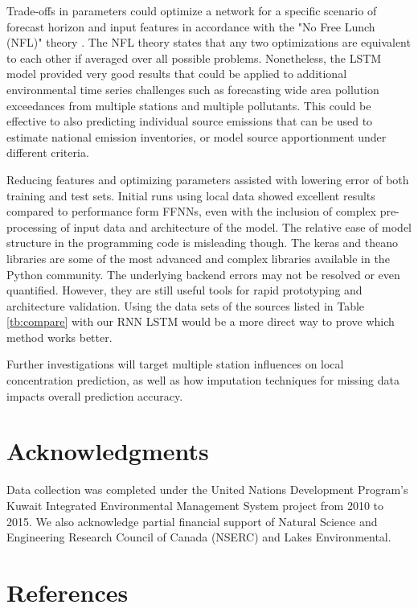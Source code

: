 \documentclass[preprint,12pt,authoryear]{elsarticle}
\begin{document}
\begin{linenumbers}
Trade-offs in parameters could optimize a network for a specific scenario of forecast horizon and input features in accordance with the "No Free Lunch (NFL)" theory \citep{Wolpert1997}. The NFL theory states that any two optimizations are equivalent to each other if averaged over all possible problems. Nonetheless, the LSTM model provided very good results that could be applied to additional environmental time series challenges such as forecasting wide area pollution exceedances from multiple stations and multiple pollutants. This could be effective to also predicting individual source emissions that can be used to estimate national emission inventories, or model source apportionment under different criteria. 

Reducing features and optimizing parameters assisted with lowering error of both training and test sets. Initial runs using local data showed excellent results compared to performance form FFNNs, even with the inclusion of complex pre-processing of input data and architecture of the model. The relative ease of model structure in the programming code is misleading though. The keras and theano libraries are some of the most advanced and complex libraries available in the Python community. The underlying backend errors may not be resolved or even quantified. However, they are still useful tools for rapid prototyping and architecture validation. Using the data sets of the sources listed in Table \ref{tb:compare} with our RNN LSTM would be a more direct way to prove which method works better.

Further investigations will target multiple station influences on local concentration prediction, as well as how imputation techniques for missing data impacts overall prediction accuracy. 

\section{Acknowledgments}
Data collection was completed under the United Nations Development Program's Kuwait Integrated Environmental Management System project from 2010 to 2015.  We also acknowledge partial financial support of Natural Science and Engineering Research Council of Canada (NSERC) and Lakes Environmental.
 
\section{References}

\end{linenumbers}
{}

\end{document}
